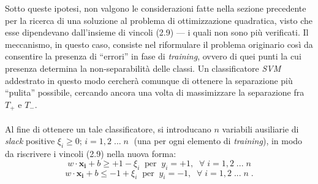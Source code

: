 Sotto queste ipotesi, non valgono le considerazioni fatte nella sezione precedente per la ricerca di una soluzione al problema di ottimizzazione quadratica, visto che esse dipendevano dall'insieme di vincoli (2.9) --- i quali non sono più verificati.
Il meccanismo, in questo caso, consiste nel riformulare il problema originario così da consentire la presenza di ``errori'' in fase di \textit{training}, ovvero di quei punti la cui presenza determina la non-separabilità delle classi. Un classificatore \textit{SVM} addestrato in questo modo cercherà comunque di ottenere la separazione più ``pulita'' possibile, cercando ancora una volta di massimizzare la separazione fra $T_+$ e $T_-$.

\paragraph{}
Al fine di ottenere un tale classificatore, si introducano $n$ variabili ausiliarie di \textit{slack} positive $\xi_i \geq 0$; $i = 1, 2 \; ... \; n \;$ (una per ogni elemento di \textit{training}), in modo da riscrivere i vincoli (2.9) nella nuova forma:
\begin{equation}
	w \cdot \boldsymbol{x_i} + b \geq +1 - \xi_i \;\; \mbox{per} \;\; y_i = +1, \;\; \forall \; i = 1, 2 \;...\; n
\end{equation}
\begin{equation}
	w \cdot \boldsymbol{x_i} + b \leq -1 + \xi_i \;\; \mbox{per} \;\; y_i = -1, \;\; \forall \; i = 1, 2 \;...\; n \;.
\end{equation}

